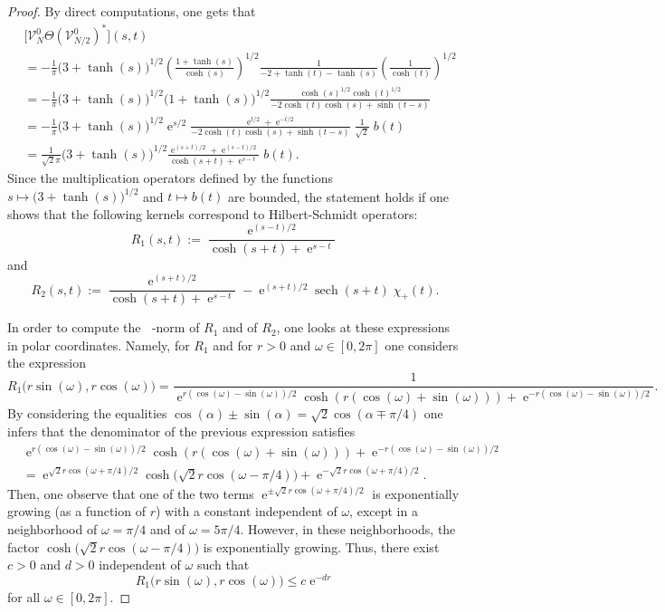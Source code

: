 \documentclass[11pt]{article}
\def\V{\mathcal V}
\def\e{\mathop{\mathrm{e}}\nolimits}
\def\ltwo{\mathop{\mathrm{L}^2}\nolimits}
\def\sech{\mathop{\mathrm{sech}}\nolimits}
\begin{document}
\begin{proof}
By direct computations, one gets that
\begin{align*}
& \big[\V^0_N \Theta(\V^0_{N/2})^*\big](s,t)\\
& = -\frac{1}{\pi}\big(3+\tanh(s)\big)^{1/2} \left(\frac{1+\tanh(s)}{\cosh(s)}\right)^{1/2}
\frac{1}{-2+\tanh(t)-\tanh(s)}\left(\frac{1}{\cosh(t)}\right)^{1/2} \\
& = -\frac{1}{\pi}\big(3+\tanh(s)\big)^{1/2} \big(1+\tanh(s)\big)^{1/2}
\frac{\cosh(s)^{1/2}\cosh(t)^{1/2}}{-2\cosh(t)\cosh(s)+\sinh(t-s)} \\
& =  -\frac{1}{\pi}\big(3+\tanh(s)\big)^{1/2} \e^{s/2}
\frac{\e^{t/2}+\e^{-t/2}}{-2\cosh(t)\cosh(s)+\sinh(t-s)}\;\!\frac{1}{\sqrt{2}} \;\!b(t) \\
& =  \frac{1}{\sqrt{2}\pi}\big(3+\tanh(s)\big)^{1/2} 
\frac{\e^{(s+t)/2}+\e^{(s-t)/2}}{\cosh(s+t)+\e^{s-t}} \;\!b(t). 
\end{align*}
Since the multiplication operators defined by the functions
$s\mapsto \big(3+\tanh(s)\big)^{1/2}$ and $t\mapsto b(t)$
are bounded, the statement holds if one shows that the following kernels correspond
to Hilbert-Schmidt operators:
$$
R_1(s,t):=\frac{\e^{(s-t)/2}}{\cosh(s+t)+\e^{s-t}}
$$
and
$$
R_2(s,t):=\frac{\e^{(s+t)/2}}{\cosh(s+t)+\e^{s-t}} - \e^{(s+t)/2}\sech(s+t)\;\! \chi_+(t).
$$

In order to compute the $\ltwo$-norm of $R_1$ and of $R_2$, one looks at these expressions in polar coordinates. Namely, for $R_1$ and for $r>0$ and $\omega \in [0,2\pi]$ one considers  the expression
$$
R_1\big(r\sin(\omega),r\cos(\omega)\big)=
\frac{1}{\e^{r(\cos(\omega)-\sin(\omega))/2}\cosh(r(\cos(\omega)+\sin(\omega)))+\e^{-r(\cos(\omega)-\sin(\omega))/2}}.
$$
By considering the equalities $\cos(\alpha)\pm\sin(\alpha)=\sqrt{2}\cos(\alpha\mp\pi/4)$
one infers that
the denominator of the previous expression satisfies
\begin{align*}
& \e^{r(\cos(\omega)-\sin(\omega))/2}\cosh(r(\cos(\omega)+\sin(\omega)))+\e^{-r(\cos(\omega)-\sin(\omega))/2} \\
& =\e^{\sqrt{2}r\cos(\omega+\pi/4)/2}\cosh\big(\sqrt{2}r\cos(\omega-\pi/4)\big)+\e^{-\sqrt{2}r\cos(\omega+\pi/4)/2}.
\end{align*}
Then, one observe that one of the two terms $\e^{\pm\sqrt{2}r\cos(\omega+\pi/4)/2}$ is exponentially growing (as a function of $r$) with a constant independent of $\omega$, except in a neighborhood of $\omega=\pi/4$ and of $\omega=5\pi/4$.
However, in these neighborhoods, the factor $\cosh\big(\sqrt{2}r\cos(\omega-\pi/4)\big)$ is exponentially growing. Thus, there exist $c>0$ and $d>0$ independent of $\omega$ such that
$$
R_1\big(r\sin(\omega),r\cos(\omega)\big)\leq c\e^{-dr}
$$
for all $\omega \in [0,2\pi]$. 


\end{proof}
\end{document}
